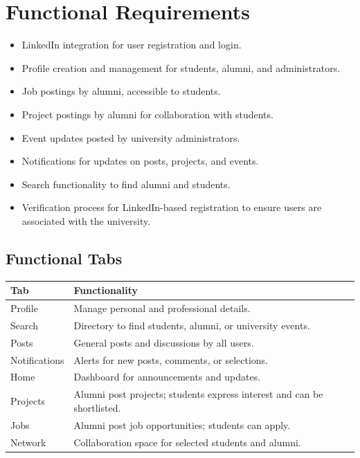 \documentclass[a4paper,12pt]{article}
\begin{document}
\section{Functional Requirements}
\begin{itemize}
    \item LinkedIn integration for user registration and login.
    \item Profile creation and management for students, alumni, and administrators.
    \item Job postings by alumni, accessible to students.
    \item Project postings by alumni for collaboration with students.
    \item Event updates posted by university administrators.
    \item Notifications for updates on posts, projects, and events.
    \item Search functionality to find alumni and students.
    \item Verification process for LinkedIn-based registration to ensure users are associated with the university.
\end{itemize}


\newpage
\subsection{Functional Tabs}
\begin{longtable}{|l|p{12cm}|}
\hline
\textbf{Tab} & \textbf{Functionality} \\ \hline
Profile & Manage personal and professional details. \\ \hline
Search & Directory to find students, alumni, or university events. \\ \hline
Posts & General posts and discussions by all users. \\ \hline
Notifications & Alerts for new posts, comments, or selections. \\ \hline
Home & Dashboard for announcements and updates. \\ \hline
Projects & Alumni post projects; students express interest and can be shortlisted. \\ \hline
Jobs & Alumni post job opportunities; students can apply. \\ \hline
Network & Collaboration space for selected students and alumni. \\ \hline
\end{longtable}
\end{document}
